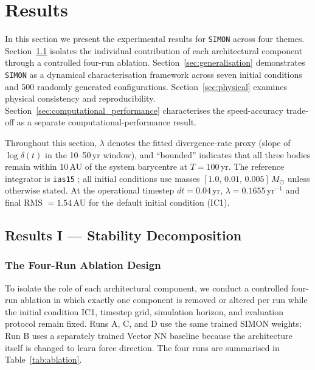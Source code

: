 \documentclass[12pt]{article}
\begin{document}
\section{Results}
\label{sec:results}

In this section we present the experimental results for \texttt{SIMON} across four
themes. Section~\ref{sec:stability} isolates the individual contribution of each
architectural component through a controlled four-run ablation. Section~\ref{sec:generalisation}
demonstrates \texttt{SIMON} as a dynamical characterisation framework across
seven initial conditions and 500 randomly generated configurations. Section~\ref{sec:physical}
examines physical consistency and reproducibility. Section~\ref{sec:computational_performance}
characterises the speed-accuracy trade-off as a separate computational-performance result.

Throughout this section, $\lambda$ denotes the fitted divergence-rate proxy (slope of
$\log\delta(t)$ in the 10--50\,yr window), and ``bounded'' indicates that all three
bodies remain within 10\,AU of the system barycentre at $T = 100$\,yr. The reference
integrator is \texttt{ias15} \citep{Rein_2014}; all initial conditions use masses
$[1.0,\,0.01,\,0.005]\,M_\odot$ unless otherwise stated. At the operational timestep
$dt = 0.04$\,yr, $\lambda = 0.1655$\,yr$^{-1}$ and final RMS $= 1.54$\,AU for the
default initial condition (IC1).

\subsection{Results I --- Stability Decomposition}
\label{sec:stability}

\subsubsection{The Four-Run Ablation Design}

To isolate the role of each architectural component, we conduct a controlled four-run
ablation in which exactly one component is removed or altered per run while the initial
condition IC1, timestep grid, simulation horizon, and evaluation protocol remain fixed. Runs
A, C, and D use the same trained SIMON weights; Run B uses a separately trained
Vector NN baseline because the architecture itself is changed to learn force direction.
The four runs are summarised in
Table~\ref{tab:ablation}.
\end{document}

